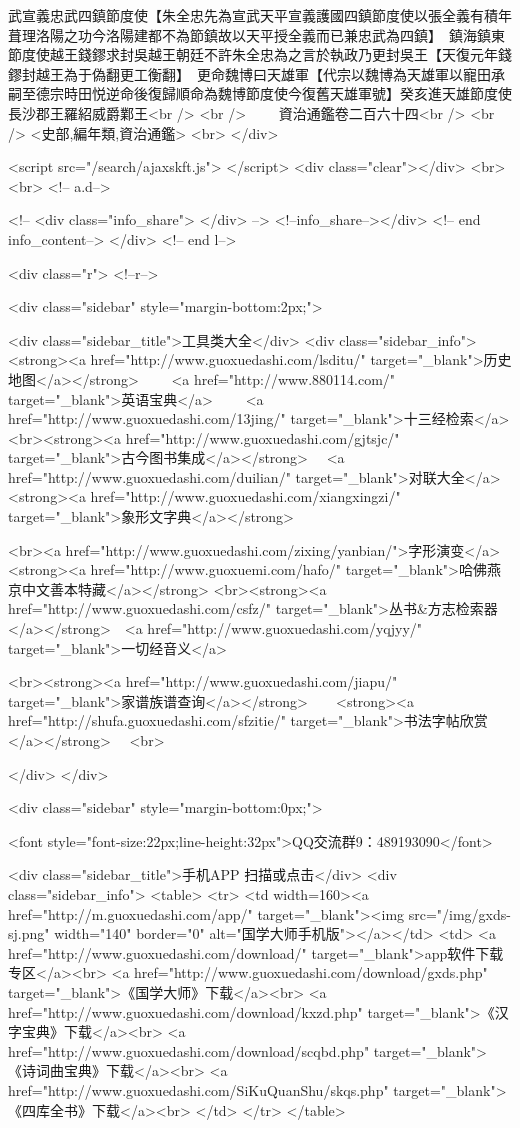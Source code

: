 武宣義忠武四鎮節度使【朱全忠先為宣武天平宣義護國四鎮節度使以張全義有積年葺理洛陽之功今洛陽建都不為節鎮故以天平授全義而已兼忠武為四鎮】　鎮海鎮東節度使越王錢鏐求封吳越王朝廷不許朱全忠為之言於執政乃更封吳王【天復元年錢鏐封越王為于偽翻更工衡翻】　更命魏博曰天雄軍【代宗以魏博為天雄軍以寵田承嗣至德宗時田悦逆命後復歸順命為魏博節度使今復舊天雄軍號】癸亥進天雄節度使長沙郡王羅紹威爵鄴王<br />
<br />
　　資治通鑑卷二百六十四<br />
<br />
<史部,編年類,資治通鑑>  <br>
   </div> 

<script src="/search/ajaxskft.js"> </script>
 <div class="clear"></div>
<br>
<br>
 <!-- a.d-->

 <!--
<div class="info_share">
</div> 
-->
 <!--info_share--></div>   <!-- end info_content-->
  </div> <!-- end l-->

<div class="r">   <!--r-->



<div class="sidebar"  style="margin-bottom:2px;">

 
<div class="sidebar_title">工具类大全</div>
<div class="sidebar_info">
<strong><a href="http://www.guoxuedashi.com/lsditu/" target="_blank">历史地图</a></strong>　　
<a href="http://www.880114.com/" target="_blank">英语宝典</a>　　
<a href="http://www.guoxuedashi.com/13jing/" target="_blank">十三经检索</a>　
<br><strong><a href="http://www.guoxuedashi.com/gjtsjc/" target="_blank">古今图书集成</a></strong>　
<a href="http://www.guoxuedashi.com/duilian/" target="_blank">对联大全</a>　<strong><a href="http://www.guoxuedashi.com/xiangxingzi/" target="_blank">象形文字典</a></strong>　

<br><a href="http://www.guoxuedashi.com/zixing/yanbian/">字形演变</a>　　<strong><a href="http://www.guoxuemi.com/hafo/" target="_blank">哈佛燕京中文善本特藏</a></strong>
<br><strong><a href="http://www.guoxuedashi.com/csfz/" target="_blank">丛书&方志检索器</a></strong>　<a href="http://www.guoxuedashi.com/yqjyy/" target="_blank">一切经音义</a>　　

<br><strong><a href="http://www.guoxuedashi.com/jiapu/" target="_blank">家谱族谱查询</a></strong>　　<strong><a href="http://shufa.guoxuedashi.com/sfzitie/" target="_blank">书法字帖欣赏</a></strong>　
<br>

</div>
</div>


<div class="sidebar" style="margin-bottom:0px;">

<font style="font-size:22px;line-height:32px">QQ交流群9：489193090</font>


<div class="sidebar_title">手机APP 扫描或点击</div>
<div class="sidebar_info">
<table>
<tr>
	<td width=160><a href="http://m.guoxuedashi.com/app/" target="_blank"><img src="/img/gxds-sj.png" width="140"  border="0" alt="国学大师手机版"></a></td>
	<td>
<a href="http://www.guoxuedashi.com/download/" target="_blank">app软件下载专区</a><br>
<a href="http://www.guoxuedashi.com/download/gxds.php" target="_blank">《国学大师》下载</a><br>
<a href="http://www.guoxuedashi.com/download/kxzd.php" target="_blank">《汉字宝典》下载</a><br>
<a href="http://www.guoxuedashi.com/download/scqbd.php" target="_blank">《诗词曲宝典》下载</a><br>
<a href="http://www.guoxuedashi.com/SiKuQuanShu/skqs.php" target="_blank">《四库全书》下载</a><br>
</td>
</tr>
</table>

